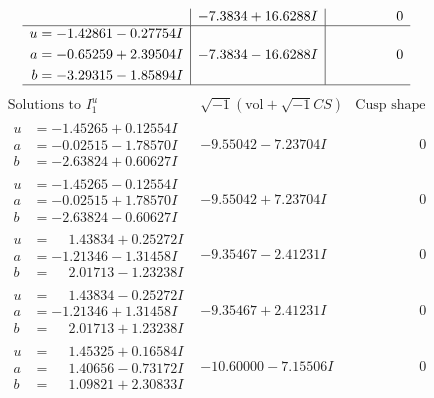 \documentclass[1p]{elsarticle_modified}
\theoremstyle{definition}
\newcommand{\I}{\sqrt{-1}}
\begin{document}
$$\begin{array}{c|c|c}
 & -7.3834 + 16.6288 I & \phantom{-0.000000 } 0 \\ \hline\begin{aligned}
u &= -1.42861 - 0.27754 I \\
a &= -0.65259 + 2.39504 I \\
b &= -3.29315 - 1.85894 I\end{aligned}
 & -7.3834 - 16.6288 I & \phantom{-0.000000 } 0\\
 \hline 
 \end{array}$$\newpage$$\begin{array}{c|c|c}  
\text{Solutions to }I^u_{1}& \I (\text{vol} + \sqrt{-1}CS) & \text{Cusp shape}\\
 \hline 
\begin{aligned}
u &= -1.45265 + 0.12554 I \\
a &= -0.02515 - 1.78570 I \\
b &= -2.63824 + 0.60627 I\end{aligned}
 & -9.55042 - 7.23704 I & \phantom{-0.000000 } 0 \\ \hline\begin{aligned}
u &= -1.45265 - 0.12554 I \\
a &= -0.02515 + 1.78570 I \\
b &= -2.63824 - 0.60627 I\end{aligned}
 & -9.55042 + 7.23704 I & \phantom{-0.000000 } 0 \\ \hline\begin{aligned}
u &= \phantom{-}1.43834 + 0.25272 I \\
a &= -1.21346 - 1.31458 I \\
b &= \phantom{-}2.01713 - 1.23238 I\end{aligned}
 & -9.35467 - 2.41231 I & \phantom{-0.000000 } 0 \\ \hline\begin{aligned}
u &= \phantom{-}1.43834 - 0.25272 I \\
a &= -1.21346 + 1.31458 I \\
b &= \phantom{-}2.01713 + 1.23238 I\end{aligned}
 & -9.35467 + 2.41231 I & \phantom{-0.000000 } 0 \\ \hline\begin{aligned}
u &= \phantom{-}1.45325 + 0.16584 I \\
a &= \phantom{-}1.40656 - 0.73172 I \\
b &= \phantom{-}1.09821 + 2.30833 I\end{aligned}
 & -10.60000 - 7.15506 I & \phantom{-0.000000 } 0 \\ \hline\begin{aligned}

\end{aligned}
\end{array}$$
\end{document}
